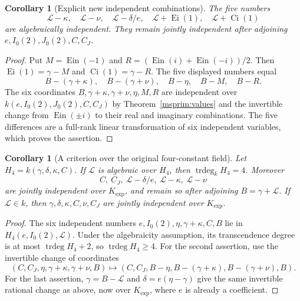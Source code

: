 \documentclass[11pt]{article}
\newtheorem{corollary}[theorem]{Corollary}
\theoremstyle{definition}
\theoremstyle{remark}
\newcommand{\Ein}{\operatorname{Ein}}
\begin{document}
\begin{corollary}[Explicit new independent combinations]
\label{prim:combinations}
The five numbers
\[
 \mathcal L-\kappa,\quad \mathcal L-\nu,\quad
 \mathcal L-\delta/e,\quad
 \mathcal L+\operatorname{Ei}(1),\quad
 \mathcal L+\operatorname{Ci}(1)
\]
are algebraically independent. They remain jointly independent after
adjoining $e,I_0(2),J_0(2),C,C_J$.
\end{corollary}
\begin{proof}
Put $M=\Ein(-1)$ and
$R=(\Ein(i)+\Ein(-i))/2$.
Then $\operatorname{Ei}(1)=\gamma-M$ and
$\operatorname{Ci}(1)=\gamma-R$. The five displayed numbers equal
\[
 B-(\gamma+\kappa),\quad B-(\gamma+\nu),\quad
 B-\eta,\quad B-M,\quad B-R.
\]
The six coordinates $B,\gamma+\kappa,\gamma+\nu,\eta,M,R$
are independent over $k(e,I_0(2),J_0(2),C,C_J)$ by
Theorem~\ref{msprim:values} and the invertible change from
$\Ein(\pm i)$ to their real and imaginary combinations.
The five differences are a full-rank linear transformation of six
independent variables, which proves the assertion.
\end{proof}

\begin{corollary}[A criterion over the original four-constant field]
Let $H_4=k(\gamma,\delta,\kappa,C)$. If $\mathcal L$ is algebraic
 over $H_4$, then $\operatorname{trdeg}_k H_4=4$.
Moreover
\[
 C,\ C_J,\ \mathcal L-\delta/e,\ \mathcal L-\kappa,\ \mathcal L-\nu
\]
are jointly independent over $K_{\exp}$, and remain so after adjoining
$B=\gamma+\mathcal L$. If $\mathcal L\in k$, then
$\gamma,\delta,\kappa,C,\nu,C_J$ are jointly independent over
$K_{\exp}$.
\end{corollary}
\begin{proof}
The six independent numbers $e,I_0(2),\eta,\gamma+\kappa,C,B$
lie in $H_4(e,I_0(2),\mathcal L)$. Under the algebraicity assumption,
its transcendence degree is at most $\operatorname{trdeg} H_4+2$,
so $\operatorname{trdeg}H_4\ge4$.
For the second assertion, use the invertible change of coordinates
\[
 (C,C_J,\eta,\gamma+\kappa,\gamma+\nu,B)
 \longmapsto
 (C,C_J,B-\eta,B-(\gamma+\kappa),B-(\gamma+\nu),B).
\]
For the last assertion, $\gamma=B-\mathcal L$ and
$\delta=e(\eta-\gamma)$ give the same invertible rational change
as above, now over $K_{\exp}$, where $e$ is already a coefficient.
\end{proof}



\end{document}
